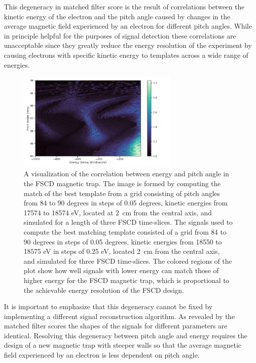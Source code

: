 This degeneracy in matched filter score is the result of correlations between the kinetic energy of the electron and the pitch angle caused by changes in the average magnetic field experienced by an electron for different pitch angles. While in principle helpful for the purposes of signal detection these correlations are unacceptable since they greatly reduce the energy resolution of the experiment by causing electrons with specific kinetic energy to templates across a wide range of energies.
\begin{figure}[htbp]
    \centering
    \includegraphics[width=0.7\textwidth]{figs/Chapter-4/230517_energy_pitch_correlation_map.png}
    \caption{A visualization of the correlation between energy and pitch angle in the FSCD magnetic trap. The image is formed by computing the match of the best template from a grid consisting of pitch angles from 84 to 90 degrees in steps of 0.05 degrees, kinetic energies from 17574 to 18574 eV, located at 2~cm from the central axis, and simulated for a length of three FSCD time-slices. The signals used to compute the best matching template consisted of a grid from 84 to 90 degrees in steps of 0.05 degrees, kinetic energies from 18550 to 18575 eV in steps of 0.25 eV, located 2~cm from the central axis, and simulated for three FSCD time-slices. The colored regions of the plot show how well signals with lower energy can match those of higher energy for the FSCD magnetic trap, which is proportional to the achievable energy resolution of the FSCD design.}
    \label{fig:chap4-mf-degeneracy-large-scale}
\end{figure}
It is important to emphasize that this degeneracy cannot be fixed by implementing a different signal reconstruction algorithm. As revealed by the matched filter scores the shapes of the signals for different parameters are identical. Resolving this degeneracy between pitch angle and energy requires the design of a new magnetic trap with steeper walls so that the average magnetic field experienced by an electron is less dependent on pitch angle.

